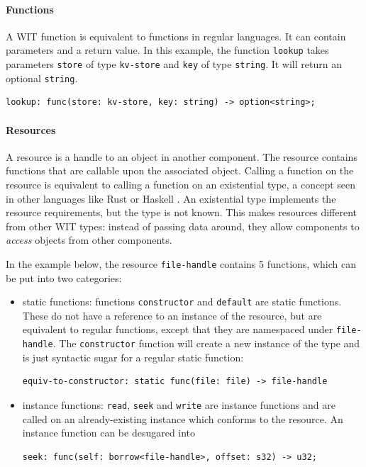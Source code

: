 \paragraph{Functions}
A WIT function is equivalent to functions in regular languages. It can contain parameters and a return value.
In this example, the function \texttt{lookup} takes parameters \texttt{store} of type \texttt{kv-store} and \texttt{key} of type \texttt{string}. It will return an optional \texttt{string}.

\begin{lstlisting}[language=wit]
lookup: func(store: kv-store, key: string) -> option<string>;
\end{lstlisting}

\paragraph{Resources}
A resource is a handle to an object in another component. The resource contains functions that are callable upon the associated object. Calling a function on the resource is equivalent to calling a function on an existential type, a concept seen in other languages like Rust or Haskell \cite{haskell_existential}. An existential type implements the resource requirements, but the type is not known. This makes resources different from other WIT types: instead of passing data around, they allow components to \textit{access} objects from other components.

In the example below, the resource \texttt{file-handle} contains 5 functions, which can be put into two categories:
\begin{itemize}

\item static functions: functions \texttt{constructor} and \texttt{default} are static functions. These do not have a reference to an instance of the resource, but are equivalent to regular functions, except that they are namespaced under \texttt{file-handle}. The \texttt{constructor} function will create a new instance of the type and is just syntactic sugar for a regular static function:
\begin{lstlisting}[language=wit]
equiv-to-constructor: static func(file: file) -> file-handle
\end{lstlisting}

\item instance functions: \texttt{read}, \texttt{seek} and \texttt{write} are instance functions and are called on an already-existing instance which conforms to the resource. An instance function can be desugared into
\begin{lstlisting}[language=wit]
seek: func(self: borrow<file-handle>, offset: s32) -> u32;
\end{lstlisting}

\end{itemize}

